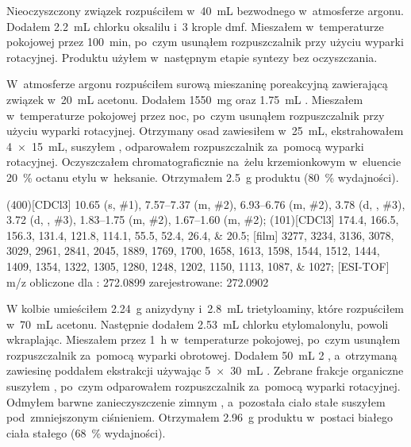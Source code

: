 Nieoczyszczony związek  rozpuściłem w~\SI{40}{\mL}
  bezwodnego  w~atmosferze argonu. Dodałem \SI{2.2}{\mL} chlorku oksalilu
  i~\num{3} krople \gls{dmf}.
Mieszałem w~temperaturze pokojowej przez \SI{100}{\minute}, po~czym usunąłem rozpuszczalnik
  przy użyciu wyparki rotacyjnej.
Produktu użyłem w~następnym etapie syntezy bez oczyszczania.

W~atmosferze argonu rozpuściłem surową mieszaninę poreakcyjną zawierającą związek
   w~\SI{20}{\mL} acetonu.
Dodałem \SI{1550}{\milli\gram}  oraz \SI{1.75}{\mL} .
Mieszałem w~temperaturze pokojowej przez noc, po~czym usunąłem rozpuszczalnik przy użyciu
  wyparki rotacyjnej.
Otrzymany osad zawiesiłem w~\SI{25}{\mL},
  ekstrahowałem \SI[product-units = single]{4 x 15}{\mL},
  suszyłem , odparowałem rozpuszczalnik za~pomocą wyparki rotacyjnej.
Oczyszczałem chromatograficznie na~żelu krzemionkowym w~eluencie \SI{20}{\percent} octanu
  etylu w~heksanie.
Otrzymałem \SI{2.5}{\gram} produktu (\SI{80}{\percent} wydajności).

\begin{fullexp}
  \NMR(400)[CDCl3] \num{10.65} (s, \#{1}), \numrange{7.57}{7.37} (m, \#{2}), \numrange{6.93}{6.76} (m, \#{2}), \num{3.78} (d, , \#{3}), \num{3.72} (d, , \#{3}), \numrange{1.83}{1.75} (m, \#{2}), \numrange{1.67}{1.60} (m, \#{2});
  (101)[CDCl3] \numlist{174.4; 166.5; 156.3; 131.4; 121.8; 114.1; 55.5; 52.4; 26.4; 20.5};
  [film] \numlist{3277; 3234; 3136; 3078; 3029; 2961; 2841; 2045; 1889; 1769; 1700; 1658; 1613; 1598; 1544; 1512; 1444; 1409; 1354; 1322; 1305; 1280; 1248; 1202; 1150; 1113; 1087; 1027};
  [ESI-TOF] m/z obliczone dla : \num{272.0899} zarejestrowane: \num{272.0902}
\end{fullexp}

W kolbie umieściłem \SI{2.24}{\gram} anizydyny i~\SI{2.8}{\mL} trietyloaminy,
  które rozpuściłem w~\SI{70}{\mL} acetonu.
Następnie dodałem \SI{2.53}{\mL} chlorku etylomalonylu, powoli wkraplając.
Mieszałem przez \SI{1}{\hour} w~temperaturze pokojowej, po~czym usunąłem rozpuszczalnik
  za~pomocą wyparki obrotowej.
Dodałem \SI{50}{\mL} \SI{2}{\Molar} , a~otrzymaną zawiesinę poddałem ekstrakcji
  używając \SI[product-units = single]{5 x 30}{\mL} .
Zebrane frakcje organiczne suszyłem , po~czym odparowałem rozpuszczalnik za~pomocą
  wyparki rotacyjnej.
Odmyłem barwne zanieczyszczenie zimnym ,
  a~pozostała ciało stałe suszyłem pod~zmniejszonym ciśnieniem.
Otrzymałem \SI{2.96}{\gram} produktu w~postaci białego ciała stałego (\SI{68}{\percent} wydajności).

